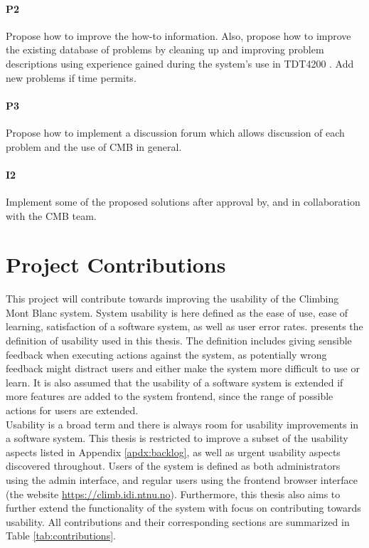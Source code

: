 \paragraph*{P2}  Propose how to improve the how-to information. Also, propose how to improve the existing database of problems by cleaning up and improving problem descriptions using experience gained during the system's use in TDT4200 \cite{TDT4200}. Add new problems if time permits.

\paragraph*{P3} Propose how to implement a discussion forum which allows discussion of each problem and the use of CMB in general.

\paragraph*{I2} Implement some of the proposed solutions after approval by, and in collaboration with the CMB team. \\

\section{Project Contributions}
\label{sec:cont}
This project will contribute towards improving the usability of the Climbing Mont Blanc system. System usability is here defined as the ease of use, ease of learning, satisfaction of a software system, as well as user error rates.  presents the definition of usability used in this thesis. The definition includes giving sensible feedback when executing actions against the system, as potentially wrong feedback might distract users and either make the system more difficult to use or learn. It is also assumed that the usability of a software system is extended if more features are added to the system frontend, since the range of possible actions for users are extended. \\

Usability is a broad term and there is always room for usability improvements in a software system. This thesis is restricted to improve a subset of the usability aspects listed in Appendix \ref{apdx:backlog}, as well as urgent usability aspects discovered throughout. Users of the system is defined as both administrators using the admin interface, and regular users using the frontend browser interface (the website \url{https://climb.idi.ntnu.no}). Furthermore, this thesis also aims to further extend the functionality of the system with focus on contributing towards usability. All contributions and their corresponding sections are summarized in Table \ref{tab:contributions}. \\

